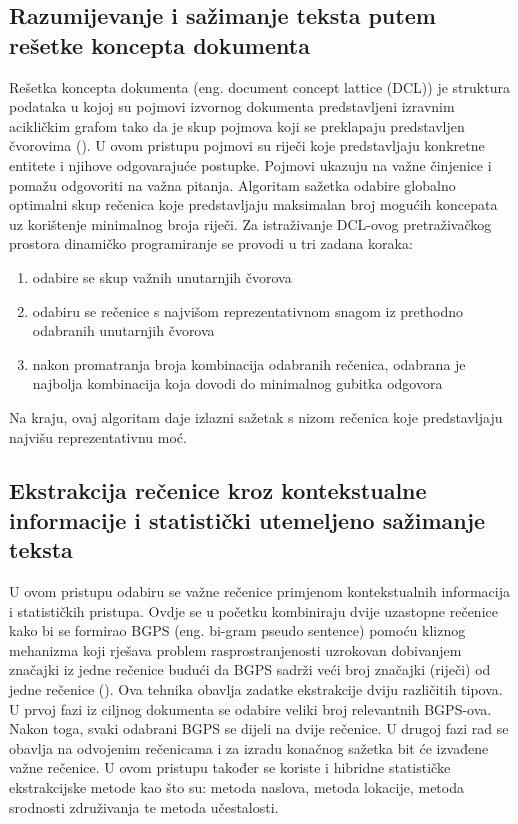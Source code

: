 \documentclass[times, utf8, zavrsni, numeric]{fer}
\begin{document}
\subsection{Razumijevanje i sažimanje teksta putem rešetke koncepta dokumenta}
Rešetka koncepta dokumenta (eng. document concept lattice (DCL)) je struktura podataka u kojoj su pojmovi izvornog dokumenta predstavljeni izravnim acikličkim grafom tako da je skup pojmova koji se preklapaju predstavljen čvorovima (\citet{article1}).
U ovom pristupu pojmovi su riječi koje predstavljaju konkretne entitete i njihove odgovarajuće postupke.
Pojmovi ukazuju na važne činjenice i pomažu odgovoriti na važna pitanja.
Algoritam sažetka odabire globalno optimalni skup rečenica koje predstavljaju maksimalan broj mogućih koncepata uz korištenje minimalnog broja riječi.
Za istraživanje DCL-ovog pretraživačkog prostora dinamičko programiranje se provodi u tri zadana koraka:
\begin{enumerate}
  \item odabire se skup važnih unutarnjih čvorova
  \item odabiru se rečenice s najvišom reprezentativnom snagom iz prethodno odabranih unutarnjih čvorova
  \item nakon promatranja broja kombinacija odabranih rečenica, odabrana je najbolja kombinacija koja dovodi do minimalnog gubitka odgovora
\end{enumerate}
Na kraju, ovaj algoritam daje izlazni sažetak s nizom rečenica koje predstavljaju najvišu reprezentativnu moć.

\subsection{Ekstrakcija rečenice kroz kontekstualne informacije i statistički utemeljeno sažimanje teksta}
U ovom pristupu odabiru se važne rečenice primjenom kontekstualnih informacija i statističkih pristupa.
Ovdje se u početku kombiniraju dvije uzastopne rečenice kako bi se formirao BGPS (eng. bi-gram pseudo sentence) pomoću kliznog mehanizma koji rješava problem rasprostranjenosti uzrokovan dobivanjem značajki iz jedne rečenice budući da BGPS sadrži veći broj značajki (riječi) od jedne rečenice (\citet{article1}).
Ova tehnika obavlja zadatke ekstrakcije dviju različitih tipova. U prvoj fazi iz ciljnog dokumenta se odabire veliki broj relevantnih BGPS-ova.
Nakon toga, svaki odabrani BGPS se dijeli na dvije rečenice.
U drugoj fazi rad se obavlja na odvojenim rečenicama i za izradu konačnog sažetka bit će izvađene važne rečenice.
U ovom pristupu također se koriste i hibridne statističke ekstrakcijske metode kao što su: metoda naslova, metoda lokacije, metoda srodnosti združivanja te metoda učestalosti.
\end{document}
